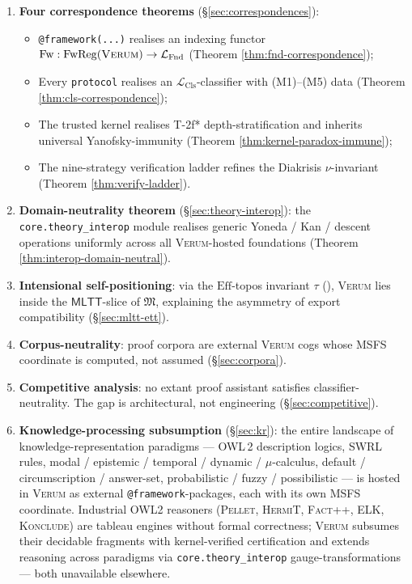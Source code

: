 \documentclass[11pt, a4paper]{article}
\theoremstyle{definition}
\theoremstyle{remark}
\newcommand{\fM}{\mathfrak{M}}
\newcommand{\LFnd}{\mathcal{L}_{\mathrm{Fnd}}}
\newcommand{\LCls}{\mathcal{L}_{\mathrm{Cls}}}
\newcommand{\MLTT}{\mathsf{MLTT}}
\newcommand{\Eff}{\ensuremath{\mathrm{Eff}}}
\newcommand{\Verum}{\textsc{Verum}}
\newcommand{\Pellet}{\textsc{Pellet}}
\newcommand{\HermiT}{\textsc{HermiT}}
\newcommand{\FactPP}{\textsc{Fact++}}
\newcommand{\ELK}{\textsc{ELK}}
\newcommand{\Konclude}{\textsc{Konclude}}
\newcommand{\OWL}{\textsc{OWL\,2}}
\newcommand{\SWRL}{\textsc{SWRL}}
\begin{document}
\begin{enumerate}[label=(C\arabic*)]
\item \textbf{Four correspondence theorems} (\S\ref{sec:correspondences}):
    \begin{itemize}[nosep]
    \item \texttt{@framework(...)} realises an indexing functor $\mathrm{Fw} : \mathrm{FwReg}(\Verum) \to \LFnd$ (Theorem \ref{thm:fnd-correspondence});
    \item Every \texttt{protocol} realises an $\LCls$-classifier with (M1)--(M5) data (Theorem \ref{thm:cls-correspondence});
    \item The trusted kernel realises T-2f* depth-stratification and inherits universal Yanofsky-immunity (Theorem \ref{thm:kernel-paradox-immune});
    \item The nine-strategy verification ladder refines the Diakrisis $\nu$-invariant (Theorem \ref{thm:verify-ladder}).
    \end{itemize}

\item \textbf{Domain-neutrality theorem} (\S\ref{sec:theory-interop}): the \texttt{core.theory\_interop} module realises generic Yoneda / Kan / descent operations uniformly across all \Verum{}-hosted foundations (Theorem \ref{thm:interop-domain-neutral}).

\item \textbf{Intensional self-positioning}: via the \Eff{}-topos invariant $\tau$ (\cite[Theorem \texttt{thm:slice-locality}]{Sereda2026MSFS}), \Verum{} lies inside the $\MLTT$-slice of $\fM$, explaining the asymmetry of export compatibility (\S\ref{sec:mltt-ett}).

\item \textbf{Corpus-neutrality}: proof corpora are external \Verum{} cogs whose MSFS coordinate is computed, not assumed (\S\ref{sec:corpora}).

\item \textbf{Competitive analysis}: no extant proof assistant satisfies classifier-neutrality. The gap is architectural, not engineering (\S\ref{sec:competitive}).

\item \textbf{Knowledge-processing subsumption} (\S\ref{sec:kr}): the entire landscape of knowledge-representation paradigms --- \OWL{} description logics, \SWRL{} rules, modal / epistemic / temporal / dynamic / $\mu$-calculus, default / circumscription / answer-set, probabilistic / fuzzy / possibilistic --- is hosted in \Verum{} as external \texttt{@framework}-packages, each with its own MSFS coordinate. Industrial OWL2 reasoners (\Pellet, \HermiT, \FactPP, \ELK, \Konclude) are tableau engines without formal correctness; \Verum{} subsumes their decidable fragments with kernel-verified certification and extends reasoning across paradigms via \texttt{core.theory\_interop} gauge-transformations --- both unavailable elsewhere.
\end{enumerate}
\end{document}
